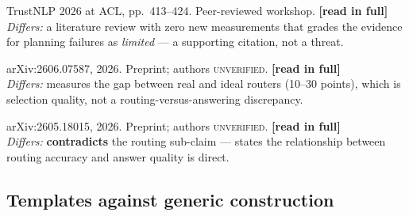 \documentclass[11pt,a4paper]{article}
\newcommand{\readtag}{\textcolor{standing}{\textbf{[read in full]}}}
\newcommand{\unver}{\textcolor{killed}{\textsc{unverified}}}
\begin{document}
\begin{description}[leftmargin=0pt, style=unboxed, itemsep=6pt]
\item[20. Garani.] TrustNLP 2026 at ACL, pp.~413--424. Peer-reviewed workshop. \readtag \\
\emph{Differs:} a literature review with zero new measurements that grades the
evidence for planning failures as \emph{limited} --- a supporting citation, not a
threat.

\item[21. \emph{The Routing Plateau.}] arXiv:2606.07587, 2026. Preprint; authors
\unver. \readtag \\
\emph{Differs:} measures the gap between real and ideal routers (10--30 points), which
is selection quality, not a routing-versus-answering discrepancy.

\item[22. \emph{LogRouter.}] arXiv:2605.18015, 2026. Preprint; authors \unver. \readtag \\
\emph{Differs:} \textbf{contradicts} the routing sub-claim --- states the relationship
between routing accuracy and answer quality is direct.
\end{description}

\subsection{Templates against generic construction}
\end{document}
